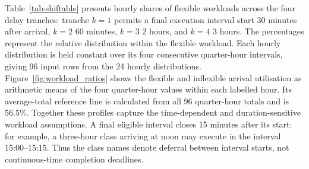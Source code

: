 \documentclass[lettersize,journal]{IEEEtran}
\providecommand{\DIFadd}[1]{{\color{blue}#1}}
\providecommand{\DIFaddbegin}{}
\providecommand{\DIFaddend}{}
\providecommand{\DIFaddFL}[1]{\DIFadd{#1}}
\providecommand{\DIFaddbeginFL}{}
\providecommand{\DIFaddendFL}{}
\begin{document}
 \DIFaddbeginFL \begin{table}[!t]
\DIFaddendFL \centering
\caption{Hourly  \DIFaddbeginFL \DIFaddFL{Tranche Shares in the Adopted Inputs }\DIFaddendFL (\%)}
\label{tab:shiftable}
 \DIFaddbegin \setlength{\tabcolsep}{4pt}
\begin{small}
\end{small}
\end{table}

\DIFaddend 

Table~\ref{tab:shiftable} presents  \DIFaddbegin \DIFadd{hourly shares }\DIFaddend of flexible workloads across  \DIFaddbegin \DIFadd{the four delay tranches: tranche $k=1$ permits a final execution interval start }\DIFaddend 30 minutes  \DIFaddbegin \DIFadd{after arrival, $k=2$ }\DIFaddend 60 minutes,  \DIFaddbegin \DIFadd{$k=3$ }\DIFaddend 2 hours, and  \DIFaddbegin \DIFadd{$k=4$ }\DIFaddend 3 hours. The percentages represent the relative distribution within the flexible workload.  \DIFaddbegin \DIFadd{Each hourly distribution is held constant over its four consecutive quarter-hour intervals, giving 96 input rows from the 24 hourly distributions. Figure~\ref{fig:workload_ratios} shows the flexible and inflexible arrival utilisation as arithmetic means of the four quarter-hour values within each labelled hour. Its average-total reference line is calculated from all 96 quarter-hour totals and is 56.5\%. Together these profiles capture }\DIFaddend the  time-dependent and duration-sensitive  \DIFaddbegin \DIFadd{workload assumptions. A final eligible interval closes 15 minutes after its start: for example, a three-hour class arriving at noon may execute in the interval 15:00--15:15. Thus the class names denote deferral between interval starts, not continuous-time completion deadlines}\DIFaddend .
\end{document}
